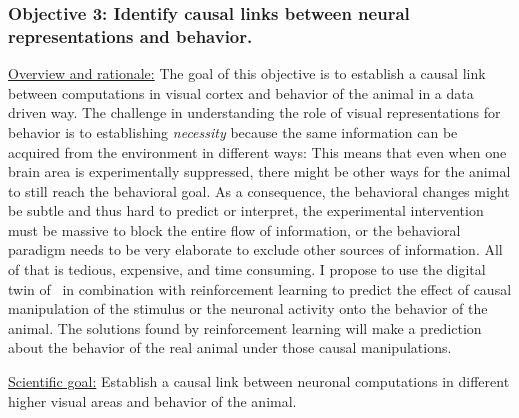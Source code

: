 \documentclass[COG,11pt]{ercgrant}
\begin{document}
\subsubsection{Objective 3: Identify causal links between neural representations and behavior.\hfill{}}

\underline{Overview and rationale:} 
The goal of this objective is to establish a causal link between computations in visual cortex and behavior of the animal in a data driven way. 
The challenge in understanding the role of visual representations for behavior is to establishing \textit{necessity} because the same information can be acquired from the environment in different ways: This means that even when one brain area is experimentally suppressed, there might be other ways for the animal to still reach the behavioral goal. 
As a consequence, the behavioral changes might be subtle and thus hard to predict or interpret, the experimental intervention must be massive to block the entire flow of information, or the behavioral paradigm needs to be very elaborate to exclude other sources of information. 
All of that is tedious, expensive, and time consuming. 
I propose to use the digital twin of \obji~in combination with reinforcement learning to predict the effect of causal manipulation of the stimulus or the neuronal activity onto the behavior of the animal. 
The solutions found by reinforcement learning will make a prediction about the behavior of the real animal under those causal manipulations. 

\underline{Scientific goal:} Establish a causal link between neuronal computations in different higher visual areas and behavior of the animal. 
\end{document}
